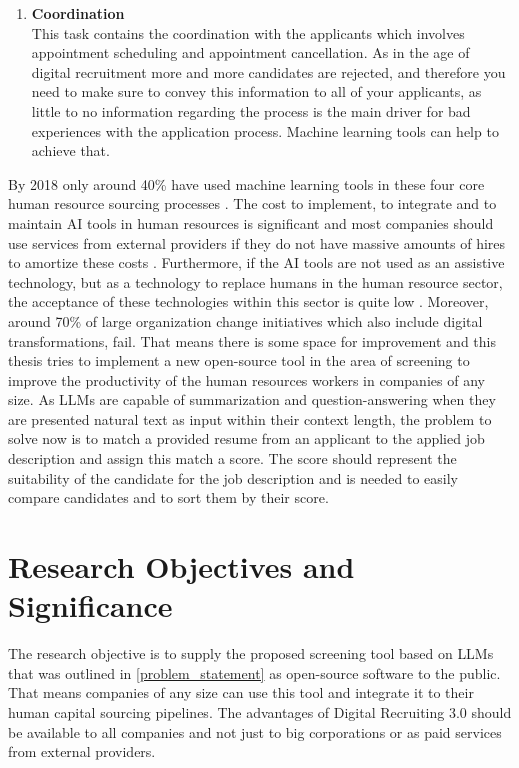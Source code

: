 \documentclass[draft,final]{thesisclass} %
\begin{document}
\begin{enumerate}
    \item \textbf{Coordination}\\
    This task contains the coordination with the applicants which involves appointment scheduling and appointment cancellation. As in the age of digital recruitment more and more candidates are rejected, and therefore you need to make sure to convey this information to all of your applicants, as little to no information regarding the process is the main driver for bad experiences with the application process. Machine learning tools can help to achieve that.
\end{enumerate}
By 2018 only around 40\% have used machine learning tools in these four core human resource sourcing processes \cite[4]{ai_recruiting}.
The cost to implement, to integrate and to maintain AI tools in human resources is significant and most companies should use services from external providers if they do not have massive amounts of hires to amortize these costs \cite[8]{ai_recruiting}.
Furthermore, if the AI tools are not used as an assistive technology, but as a technology to replace humans in the human resource sector, the acceptance of these technologies within this sector is quite low \cite[9]{ai_recruiting}.
Moreover, around 70\% of large organization change initiatives which also include digital transformations, fail.
That means there is some space for improvement and this thesis tries to implement a new open-source tool in the area of screening to improve the productivity of the human resources workers in companies of any size. As \acs{LLM}s are capable of summarization and question-answering when they are presented natural text as input within their context length, the problem to solve now is to match a provided resume from an applicant to the applied job description and assign this match a score.
The score should represent the suitability of the candidate for the job description and is needed to easily compare candidates and to sort them by their score.

\section{Research Objectives and Significance}
The research objective is to supply the proposed screening tool based on \acs{LLM}s that was outlined in \ref{problem_statement} as open-source software to the public. That means companies of any size can use this tool and integrate it to their human capital sourcing pipelines.
The advantages of Digital Recruiting 3.0 should be available to all companies and not just to big corporations or as paid services from external providers.
\end{document}
